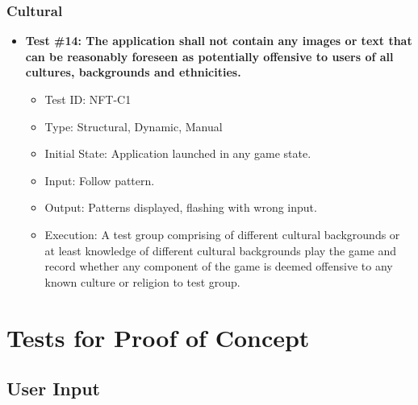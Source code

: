 \documentclass[12pt, titlepage]{article}
\begin{document}
\subsubsection{Cultural}
\begin{itemize}
\item \textbf{Test \#14: The application shall not contain any images or text that can be reasonably foreseen as potentially offensive to users of all cultures, backgrounds and ethnicities.}
\begin{itemize}
\item Test ID: NFT-C1
\item Type: Structural, Dynamic, Manual				
\item Initial State: Application launched in any game state.		
\item Input: Follow pattern.
\item Output: Patterns displayed, flashing with wrong input.		
\item Execution: A test group comprising of different cultural backgrounds or at least knowledge of different cultural backgrounds play the game and record whether any component of the game is deemed offensive to any known culture or religion to test group.
\end{itemize}
\end{itemize}


\section{Tests for Proof of Concept}

\subsection{User Input}
		
\end{document}
